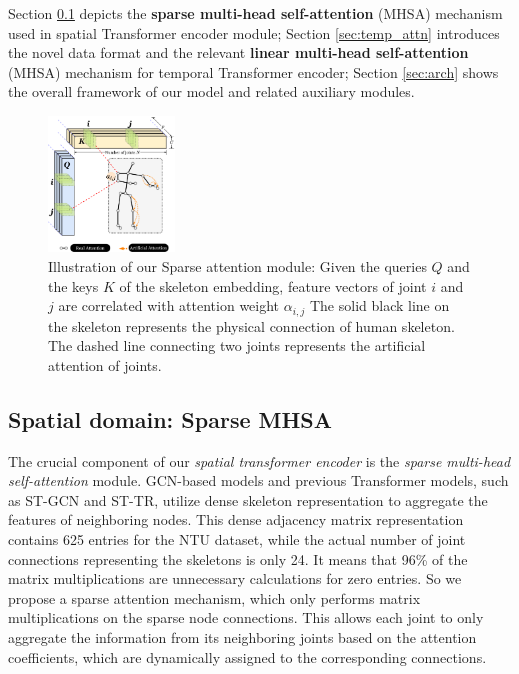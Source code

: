 \documentclass[letterpaper]{article} %
\begin{document}
Section \ref{sec:sparse_attn} depicts the \textbf{sparse multi-head self-attention} (MHSA) mechanism used in spatial Transformer encoder module; Section \ref{sec:temp_attn} introduces the novel data format and the relevant \textbf{linear multi-head self-attention} (MHSA) mechanism for temporal Transformer encoder; Section \ref{sec:arch} shows the overall framework of our model and related auxiliary modules.

\begin{figure}[ht]
    \centering
    \includegraphics[width=0.3\textwidth]{sparse_attn2.pdf}
    \caption{Illustration of our Sparse attention module: Given the queries $Q$ and the keys $K$ of the skeleton embedding, feature vectors of joint $i$ and $j$ are correlated with attention weight $\alpha_{i,j}$ The solid black line on the skeleton represents the physical connection of human skeleton. The dashed line connecting two joints represents the artificial attention of joints.}
    \label{fig:sparse_attn}
\end{figure}

\subsection{Spatial domain: Sparse MHSA} \label{sec:sparse_attn}

The crucial component of our \textit{spatial transformer encoder} is the \textit{sparse multi-head self-attention} module. GCN-based models and previous Transformer models, such as ST-GCN and ST-TR, utilize dense skeleton representation to aggregate the features of neighboring nodes. This dense adjacency matrix representation contains 625 entries for the NTU dataset, while the actual number of joint connections representing the skeletons is only 24. It means that 96\% of the matrix multiplications are unnecessary calculations for zero entries. So we propose a sparse attention mechanism, which only performs matrix multiplications on the sparse node connections. This allows each joint to only aggregate the information from its neighboring joints based on the attention coefficients, which are dynamically assigned to the corresponding connections.
\end{document}
